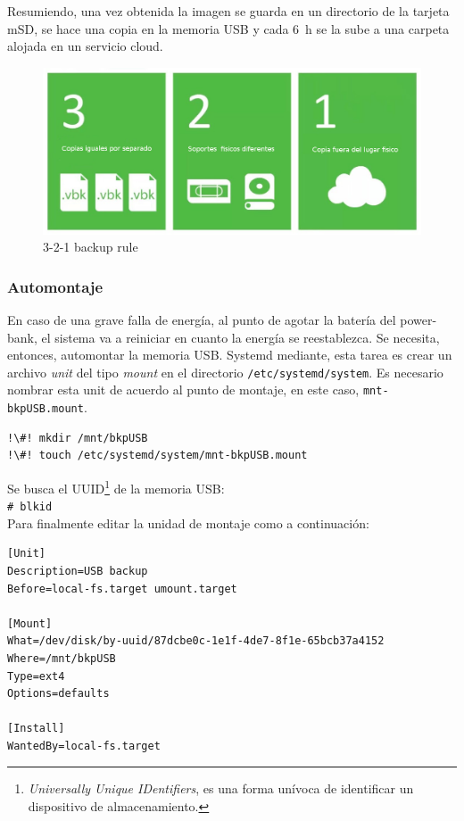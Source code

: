 \documentclass[10pt,a4paper]{article}
\newenvironment{unitFrame}[1][]{%
    \begin{mdframed}[%
        frametitle={#1},
        skipabove=\baselineskip plus 2pt minus 1pt,
        skipbelow=\baselineskip plus 2pt minus 1pt,
        linewidth=0.5pt,
        frametitlerule=true,
        frametitlebackgroundcolor=gray!10
    ]%
}{%
    \end{mdframed}
}
\begin{document}
Resumiendo, una vez obtenida la imagen se guarda en un directorio de la tarjeta mSD, se hace una copia en la memoria USB y cada \SI{6}{h} se la sube a una carpeta alojada en un servicio cloud.

\begin{figure}
\centering
    \includegraphics[scale=0.2]{321backup.jpg}
    \caption{3-2-1 backup rule}
    \label{fig:321bkp}
\end{figure}

\subsubsection{Automontaje}

En caso de una grave falla de energ\'ia, al punto de agotar la bater\'ia del power-bank, el sistema va a reiniciar en cuanto la energ\'ia se reestablezca. Se necesita, entonces, automontar la memoria USB. Systemd mediante, esta tarea es crear un archivo \emph{unit} del tipo \emph{mount} en el directorio \texttt{/etc/systemd/system}. Es necesario nombrar esta unit de acuerdo al punto de montaje, en este caso, \texttt{mnt-bkpUSB.mount}.
\begin{lstlisting}
!\#! mkdir /mnt/bkpUSB
!\#! touch /etc/systemd/system/mnt-bkpUSB.mount
\end{lstlisting}

Se busca el UUID\footnote{\emph{Universally Unique IDentifiers}, es una forma un\'ivoca de identificar un dispositivo de almacenamiento.} de la memoria USB:\\
\lstinline{# blkid}\\

Para finalmente editar la unidad de montaje como a continuaci\'on:
\begin{scriptsize}
\begin{unitFrame}[/etc/systemd/system/mnt-bkpUSB.mount]
\begin{verbatim}
[Unit]
Description=USB backup
Before=local-fs.target umount.target

[Mount]
What=/dev/disk/by-uuid/87dcbe0c-1e1f-4de7-8f1e-65bcb37a4152
Where=/mnt/bkpUSB
Type=ext4
Options=defaults

[Install]
WantedBy=local-fs.target
\end{verbatim}
\end{unitFrame}
\end{scriptsize}
\end{document}
